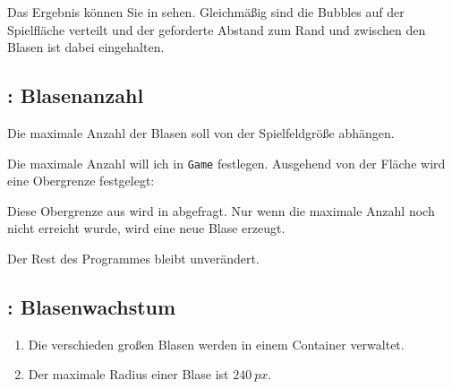 
Das Ergebnis können Sie in  sehen. Gleichmäßig sind die Bubbles auf der Spielfläche verteilt und der geforderte Abstand zum Rand und zwischen den Blasen ist dabei eingehalten.



\subsection{: Blasenanzahl}
	Die maximale Anzahl der Blasen soll von der Spielfeldgröße abhängen.
\er

Die maximale Anzahl will ich in \texttt{Game} festlegen. Ausgehend von der Fläche wird eine Obergrenze festgelegt:


Diese Obergrenze aus  wird in  abgefragt. Nur wenn die maximale Anzahl noch nicht erreicht wurde, wird eine neue Blase erzeugt.


Der Rest des Programmes bleibt unverändert.

\subsection{: Blasenwachstum}
	\begin{enumerate}
		\item Die verschieden großen Blasen werden in einem Container verwaltet.\label{reqBlasenWachstumContainer}
		
		\item Der maximale Radius einer Blase ist $240~px$.\label{reqBlasenWachstumMax}
	\end{enumerate}
\er

